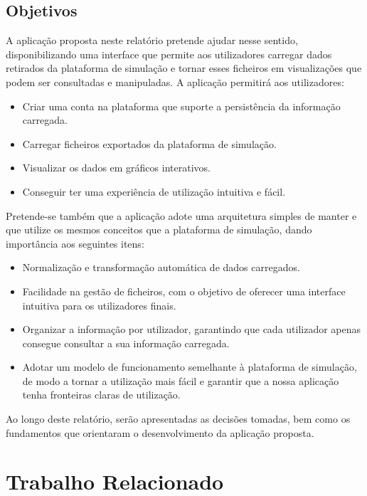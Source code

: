 \section{Objetivos}

A aplicação proposta neste relatório pretende ajudar nesse sentido, disponibilizando uma interface que permite aos utilizadores carregar dados retirados da plataforma de simulação e tornar esses ficheiros em visualizações que podem ser consultadas e manipuladas. A aplicação permitirá aos utilizadores:

\begin{itemize}
    \item Criar uma conta na plataforma que suporte a persistência da informação carregada.
    \item Carregar ficheiros exportados da plataforma de simulação.
    \item Visualizar os dados em gráficos interativos.
    \item Conseguir ter uma experiência de utilização intuitiva e fácil.
\end{itemize}

Pretende-se também que a aplicação adote uma arquitetura simples de manter e que utilize os mesmos conceitos que a plataforma de simulação, dando importância aos seguintes itens:

\begin{itemize}
    \item Normalização e transformação automática de dados carregados.
    \item Facilidade na gestão de ficheiros, com o objetivo de oferecer uma interface intuitiva para os utilizadores finais.
    \item Organizar a informação por utilizador, garantindo que cada utilizador apenas consegue consultar a sua informação carregada.
    \item Adotar um modelo de funcionamento semelhante à plataforma de simulação, de modo a tornar a utilização mais fácil e garantir que a nossa aplicação tenha fronteiras claras de utilização.
\end{itemize}

Ao longo deste relatório, serão apresentadas as decisões tomadas, bem como os fundamentos que orientaram o desenvolvimento da aplicação proposta.

\chapter{Trabalho Relacionado}
\label{ch:trabalhoRelacionado}

